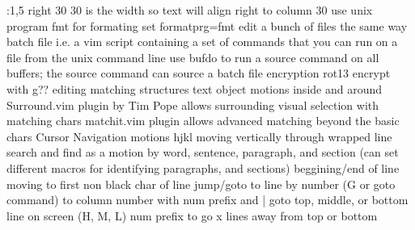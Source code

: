 \documentclass[12pt]{book}
\begin{document}
      :1,5 right 30
      30 is the width so text will align right to column 30
    use unix program fmt for formating
      set formatprg=fmt
  edit a bunch of files the same way
    batch file i.e. a vim script containing a set of commands that you can run on a file from the unix command line
    use bufdo to run a source command on all buffers; the source command can source a batch file
  encryption
    rot13 encrypt with g??
  editing matching structures
    text object motions
      inside and around
    Surround.vim plugin by Tim Pope allows surrounding visual selection with matching chars
    matchit.vim plugin allows advanced matching beyond the basic chars
Cursor Navigation
  motions
    hjkl
    moving vertically through wrapped line
    search and find as a motion
    by word, sentence, paragraph, and section (can set different macros for identifying paragraphs, and sections)
    beggining/end of line
    moving to first non black char of line
    jump/goto
      to line by number (G or goto command)
      to column number with num prefix and |
      goto top, middle, or bottom line on screen (H, M, L) num prefix to go x lines away from top or bottom
\end{document}
